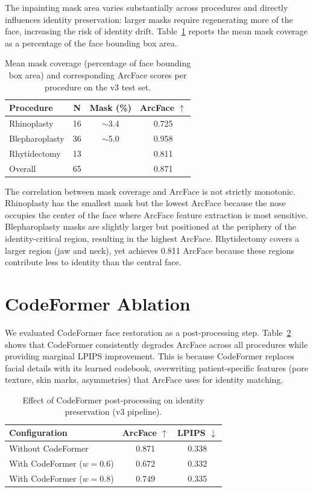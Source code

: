 \documentclass[10pt,twocolumn,letterpaper]{article}
\begin{document}
The inpainting mask area varies substantially across procedures and
directly influences identity preservation: larger masks require
regenerating more of the face, increasing the risk of identity drift.
Table~\ref{tab:mask_coverage} reports the mean mask coverage as a
percentage of the face bounding box area.

\begin{table}[H]
\centering
\caption{Mean mask coverage (percentage of face bounding box area) and
corresponding ArcFace scores per procedure on the v3 test set.}
\label{tab:mask_coverage}
\begin{tabular}{@{}lccc@{}}
\toprule
\textbf{Procedure} & \textbf{N} & \textbf{Mask (\%)} & \textbf{ArcFace} $\uparrow$ \\
\midrule
Rhinoplasty     & 16 & $\sim$3.4  & 0.725 \\
Blepharoplasty  & 36 & $\sim$5.0  & 0.958 \\
Rhytidectomy    & 13 &            & 0.811 \\
\midrule
Overall         & 65 &            & 0.871 \\
\bottomrule
\end{tabular}
\end{table}

The correlation between mask coverage and ArcFace is not strictly
monotonic. Rhinoplasty has the smallest mask but the lowest ArcFace
because the nose occupies the center of the face where ArcFace feature
extraction is most sensitive. Blepharoplasty masks are slightly larger
but positioned at the periphery of the identity-critical region,
resulting in the highest ArcFace. Rhytidectomy covers a larger region
(jaw and neck), yet achieves 0.811 ArcFace because these regions
contribute less to identity than the central face.

\section{CodeFormer Ablation}

We evaluated CodeFormer face restoration as a post-processing step.
Table~\ref{tab:codeformer} shows that CodeFormer consistently degrades
ArcFace across all procedures while providing marginal LPIPS improvement.
This is because CodeFormer replaces facial details with its learned
codebook, overwriting patient-specific features (pore texture, skin
marks, asymmetries) that ArcFace uses for identity matching.

\begin{table}[H]
\centering
\caption{Effect of CodeFormer post-processing on identity preservation
(v3 pipeline).}
\label{tab:codeformer}
\begin{tabular}{@{}lcc@{}}
\toprule
\textbf{Configuration} & \textbf{ArcFace} $\uparrow$ & \textbf{LPIPS} $\downarrow$ \\
\midrule
Without CodeFormer          & 0.871 & 0.338 \\
With CodeFormer ($w{=}0.6$) & 0.672 & 0.332 \\
With CodeFormer ($w{=}0.8$) & 0.749 & 0.335 \\
\bottomrule
\end{tabular}
\end{table}
\end{document}
